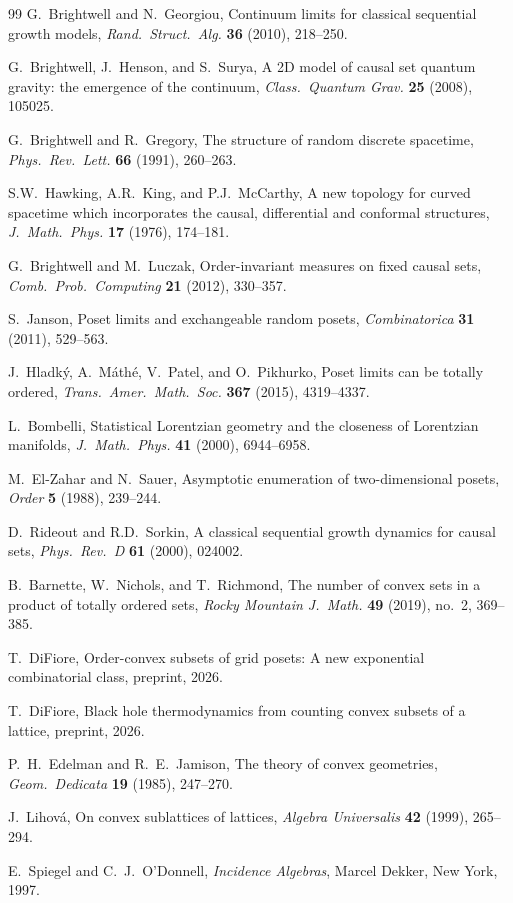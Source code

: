 \documentclass[11pt,a4paper]{article}
\theoremstyle{plain}
\theoremstyle{definition}
\theoremstyle{remark}
\begin{document}
\begin{thebibliography}{99}
G.~Brightwell and N.~Georgiou,
Continuum limits for classical sequential growth models,
\emph{Rand.\ Struct.\ Alg.} \textbf{36} (2010), 218--250.

G.~Brightwell, J.~Henson, and S.~Surya,
A 2D model of causal set quantum gravity: the emergence of the continuum,
\emph{Class.\ Quantum Grav.} \textbf{25} (2008), 105025.

G.~Brightwell and R.~Gregory,
The structure of random discrete spacetime,
\emph{Phys.\ Rev.\ Lett.} \textbf{66} (1991), 260--263.

S.W.~Hawking, A.R.~King, and P.J.~McCarthy,
A new topology for curved spacetime which incorporates the causal, differential and conformal structures,
\emph{J.\ Math.\ Phys.} \textbf{17} (1976), 174--181.

G.~Brightwell and M.~Luczak,
Order-invariant measures on fixed causal sets,
\emph{Comb.\ Prob.\ Computing} \textbf{21} (2012), 330--357.

S.~Janson,
Poset limits and exchangeable random posets,
\emph{Combinatorica} \textbf{31} (2011), 529--563.

J.~Hladk\'y, A.~M\'ath\'e, V.~Patel, and O.~Pikhurko,
Poset limits can be totally ordered,
\emph{Trans.\ Amer.\ Math.\ Soc.} \textbf{367} (2015), 4319--4337.

L.~Bombelli,
Statistical Lorentzian geometry and the closeness of Lorentzian manifolds,
\emph{J.\ Math.\ Phys.} \textbf{41} (2000), 6944--6958.

M.~El-Zahar and N.~Sauer,
Asymptotic enumeration of two-dimensional posets,
\emph{Order} \textbf{5} (1988), 239--244.

D.~Rideout and R.D.~Sorkin,
A classical sequential growth dynamics for causal sets,
\emph{Phys.\ Rev.\ D} \textbf{61} (2000), 024002.

B.~Barnette, W.~Nichols, and T.~Richmond,
The number of convex sets in a product of totally ordered sets,
\emph{Rocky Mountain J.\ Math.} \textbf{49} (2019), no.~2, 369--385.

T.~DiFiore,
Order-convex subsets of grid posets: A new exponential combinatorial class,
preprint, 2026.

T.~DiFiore,
Black hole thermodynamics from counting convex subsets of a lattice,
preprint, 2026.

P.~H.~Edelman and R.~E.~Jamison,
The theory of convex geometries,
\emph{Geom.\ Dedicata} \textbf{19} (1985), 247--270.

J.~Lihov\'a,
On convex sublattices of lattices,
\emph{Algebra Universalis} \textbf{42} (1999), 265--294.

E.~Spiegel and C.~J.~O'Donnell,
\emph{Incidence Algebras},
Marcel Dekker, New York, 1997.

\end{thebibliography}
\end{document}
